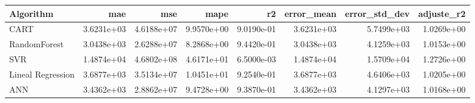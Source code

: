 \begin{tabular}{lrrrrrrr}
\toprule
Algorithm & mae & mse & mape & r2 & error_mean & error_std_dev & adjuste_r2 \\
\midrule
CART & 3.6231e+03 & 4.6188e+07 & 9.9570e+00 & 9.0190e-01 & 3.6231e+03 & 5.7499e+03 & 1.0269e+00 \\
RandomForest & 3.0438e+03 & 2.6288e+07 & 8.2868e+00 & 9.4420e-01 & 3.0438e+03 & 4.1259e+03 & 1.0153e+00 \\
SVR & 1.4874e+04 & 4.6802e+08 & 4.6171e+01 & 6.5000e-03 & 1.4874e+04 & 1.5709e+04 & 1.2726e+00 \\
Lineal Regression & 3.6877e+03 & 3.5134e+07 & 1.0451e+01 & 9.2540e-01 & 3.6877e+03 & 4.6406e+03 & 1.0205e+00 \\
ANN & 3.4362e+03 & 2.8862e+07 & 9.4728e+00 & 9.3870e-01 & 3.4362e+03 & 4.1297e+03 & 1.0168e+00 \\
\bottomrule
\end{tabular}
